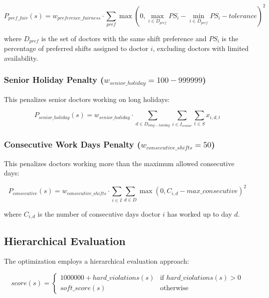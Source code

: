 \documentclass[12pt]{article}
\begin{document}
\begin{equation}
P_{pref\_fair}(s) = w_{preference\_fairness} \cdot \sum_{pref} \max(0, \max_{i \in D_{pref}} PS_i - \min_{i \in D_{pref}} PS_i - tolerance)^2
\end{equation}

where $D_{pref}$ is the set of doctors with the same shift preference and $PS_i$ is the percentage of preferred shifts assigned to doctor $i$, excluding doctors with limited availability.

\subsubsection{Senior Holiday Penalty ($w_{senior\_holiday} = 100-999999$)}
This penalizes senior doctors working on long holidays:

\begin{equation}
P_{senior\_holiday}(s) = w_{senior\_holiday} \cdot \sum_{d \in D_{long-holiday}} \sum_{i \in I_{senior}} \sum_{t \in S} x_{i,d,t}
\end{equation}

\subsubsection{Consecutive Work Days Penalty ($w_{consecutive\_shifts} = 50$)}
This penalizes doctors working more than the maximum allowed consecutive days:

\begin{equation}
P_{consecutive}(s) = w_{consecutive\_shifts} \cdot \sum_{i \in I} \sum_{d \in D} \max(0, C_{i,d} - max\_consecutive)^2
\end{equation}

where $C_{i,d}$ is the number of consecutive days doctor $i$ has worked up to day $d$.

\subsection{Hierarchical Evaluation}

The optimization employs a hierarchical evaluation approach:

\begin{equation}
score(s) = 
\begin{cases} 
1000000 + hard\_violations(s) & \text{if } hard\_violations(s) > 0 \\
soft\_score(s) & \text{otherwise}
\end{cases}
\end{equation}
\end{document}
